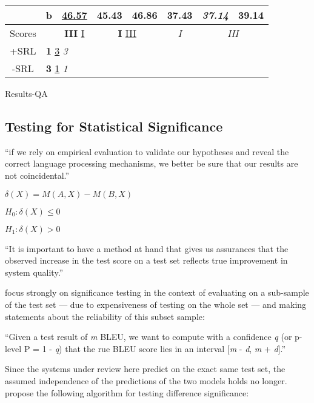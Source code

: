 {{\begin{tabular}{llccc|ccc}
      \multicolumn{1}{c}{}                       & b  & \multicolumn{1}{c|}{\underline{46.57}}          & \multicolumn{1}{c}{45.43}             & \multicolumn{1}{c|}{\textbf{46.86}}    & \multicolumn{1}{c|}{37.43}          & \multicolumn{1}{c}{\textit{37.14}} & \multicolumn{1}{c}{39.14}          \\ \hline\hline
      \multicolumn{1}{c}{Scores}                 &    & \multicolumn{1}{c|}{\textbf{III} \underline{I}} & \multicolumn{2}{c|}{\textbf{I} \underline{III}}                                & \multicolumn{1}{c|}{\textit{I}}     & \multicolumn{2}{c}{\textit{III}} \\ \cline{1-2}
      \multicolumn{1}{c}{+SRL}                   & \multicolumn{3}{l}{\textbf{1} \underline{3} \textit{3}} \\
      \multicolumn{1}{c}{-SRL}                   & \multicolumn{3}{l}{\textbf{3} \underline{1} \textit{1}}

      \end{tabular}
    }
  }{Results-QA}


\subsection{Testing for Statistical Significance}

``if we rely on empirical evaluation to validate our hypotheses and reveal the correct language processing mechanisms, we better be sure that our results are not coincidental.'' \citep{dror2018hitchhiker}


$\delta(X) = M(A, X) - M(B, X)$

$H_0:\delta(X) \leq 0$

$H_1:\delta(X) > 0$

``It is important to have a method at hand that gives us assurances that the
observed increase in the test score on a test set reflects true improvement in system
quality.'' \citep{koehn2004statistical}

\citet{koehn2004statistical} focus strongly on significance testing in the context of evaluating
on a sub-sample of the test set --- due to expensiveness of testing on the whole set ---
and making statements about the reliability of this subset sample:

``Given a test result of \emph{m} BLEU, we want to compute with a confidence \emph{q} (or
p-level P = 1 - \emph{q}) that the rue BLEU score lies in an interval [\emph{m} - \emph{d},
\emph{m} + \emph{d}].'' \citep{koehn2004statistical}

Since the systems under review here predict on the exact same test set, the assumed independence
of the predictions of the two models holds no longer. \citet{morgan2005statistical} propose
the following algorithm for testing difference significance:

